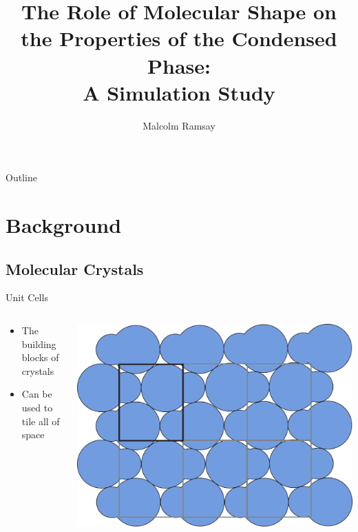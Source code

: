 \documentclass[16pt, aspectratio=43,compress]{beamer}
\title[Shapes on a Plane]{The Role of Molecular Shape on the Properties of the Condensed Phase:\\ A Simulation Study}
\author{Malcolm Ramsay}
\begin{document}

\begin{frame}
  \titlepage
\end{frame}



\begin{frame}{Outline}
    \tableofcontents
\end{frame}



\section{Background}
\subsection{Molecular Crystals}

\begin{frame}{Unit Cells}
    \begin{columns}
        \begin{column}{0.5\linewidth}
            \begin{itemize}
                \item The building blocks of crystals
                \item Can be used to tile all of space
            \end{itemize}
        \end{column}
        \begin{column}{0.5\linewidth}
            \includegraphics[width=\textwidth]{unit_cell}
        \end{column}
    \end{columns}
\end{frame}
\end{document}
